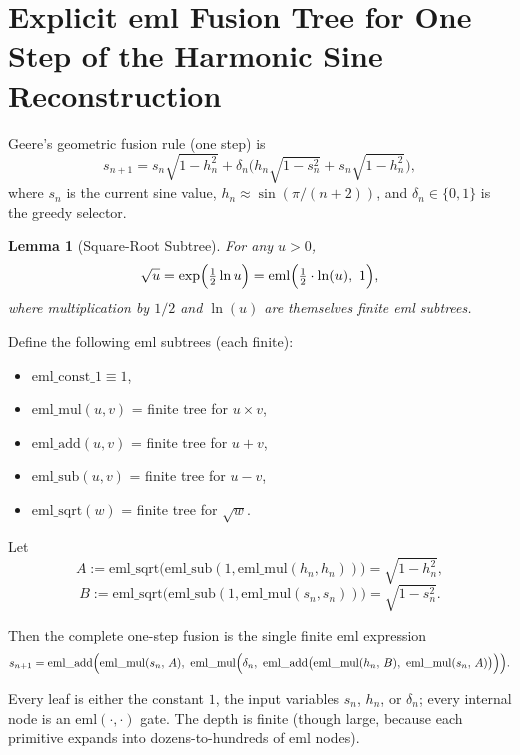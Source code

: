 \documentclass[11pt,a4paper]{article}
\newtheorem{lemma}{Lemma}
\begin{document}
\section{Explicit eml Fusion Tree for One Step of the Harmonic Sine Reconstruction}

Geere's geometric fusion rule (one step) is
\[
s_{n+1} = s_n \sqrt{1 - h_n^2} + \delta_n \bigl( h_n \sqrt{1 - s_n^2} + s_n \sqrt{1 - h_n^2} \bigr),
\]
where $s_n$ is the current sine value, $h_n \approx \sin(\pi/(n+2))$, and $\delta_n \in \{0,1\}$ is the greedy selector.

\begin{lemma}[Square-Root Subtree]
For any $u > 0$,
\[
\sqrt{u} = \exp\Bigl(\tfrac12 \ln u\Bigr) = \mathrm{eml}\Bigl(\tfrac12 \cdot \ln(u),\ 1\Bigr),
\]
where multiplication by $1/2$ and $\ln(u)$ are themselves finite eml subtrees.
\end{lemma}

Define the following eml subtrees (each finite):
\begin{itemize}
\item $\mathrm{eml\_const\_1} \equiv 1$,
\item $\mathrm{eml\_mul}(u,v)$ = finite tree for $u\times v$,
\item $\mathrm{eml\_add}(u,v)$ = finite tree for $u+v$,
\item $\mathrm{eml\_sub}(u,v)$ = finite tree for $u-v$,
\item $\mathrm{eml\_sqrt}(w)$ = finite tree for $\sqrt{w}$.
\end{itemize}

Let
\[
A := \mathrm{eml\_sqrt}\bigl(\mathrm{eml\_sub}(1, \mathrm{eml\_mul}(h_n,h_n))\bigr) = \sqrt{1-h_n^2},
\]
\[
B := \mathrm{eml\_sqrt}\bigl(\mathrm{eml\_sub}(1, \mathrm{eml\_mul}(s_n,s_n))\bigr) = \sqrt{1-s_n^2}.
\]

Then the complete one-step fusion is the single finite eml expression
\begin{equation}
s_{n+1} = \mathrm{eml\_add}\Bigl(
  \mathrm{eml\_mul}(s_n,\, A),\ 
  \mathrm{eml\_mul}\Bigl(\delta_n,\ 
    \mathrm{eml\_add}\bigl(
      \mathrm{eml\_mul}(h_n,\, B),\ 
      \mathrm{eml\_mul}(s_n,\, A)
    \bigr)
  \Bigr)
\Bigr).
\end{equation}

Every leaf is either the constant $1$, the input variables $s_n$, $h_n$, or $\delta_n$; every internal node is an $\mathrm{eml}(\cdot,\cdot)$ gate. The depth is finite (though large, because each primitive expands into dozens-to-hundreds of eml nodes).
\end{document}
